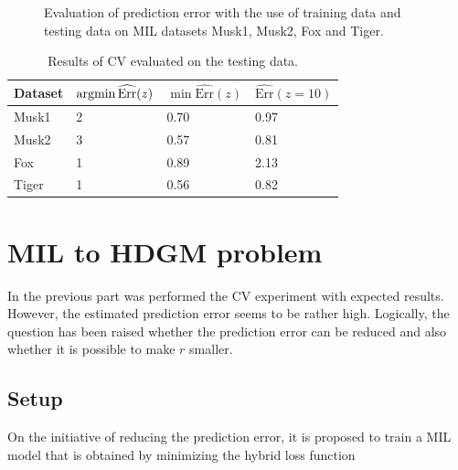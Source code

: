 \begin{figure}[h]
	\caption{Evaluation of prediction error with the use of training data and testing data on MIL datasets Musk1, Musk2, Fox and Tiger. }%
	\label{CV}%
\end{figure}

\begin{table}[h]
	\centering
	\begin{tabular}{|l|l|l|l|}
		\hline
		Dataset  &$\mathop{\mathrm{argmin}} \widehat{\mathrm{Err}}(z)$ & $ \min \widehat{\mathrm{Err}}(z)$ &$\widehat{\mathrm{Err}}(z=10)$ \\ \hline
		Musk1              & 2        & 0.70& 0.97   \\ \hline
		Musk2              & 3        & 0.57& 0.81   \\ \hline
		Fox               & 1        & 0.89 &  2.13 \\ \hline
		Tiger               & 1        & 0.56  & 0.82    \\ \hline
	\end{tabular}
	\caption{Results of CV evaluated on the testing data.}
	\label{tab:resultsCV}
\end{table}




\section{MIL to HDGM problem}
In the previous part was performed the CV experiment with expected results. However, the estimated prediction error seems to be rather high. Logically, the question has been raised whether the prediction error can be reduced and also whether it is possible to make $r$ smaller.
\subsection{Setup}
On the initiative of reducing the prediction error, it is proposed to train a MIL model that is obtained by minimizing the hybrid loss function 


